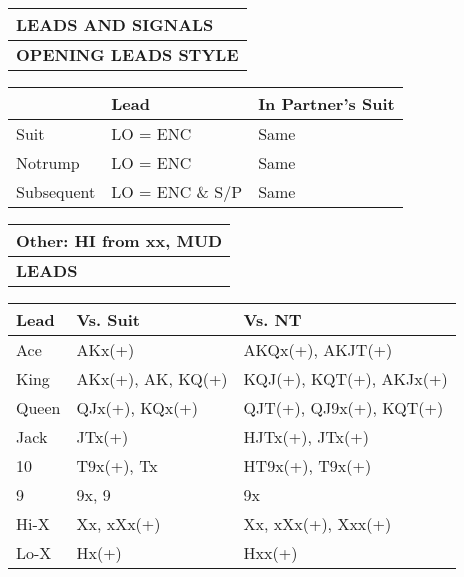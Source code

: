 \documentclass{article}
\begin{document}
\begin{minipage}{90mm}
	\begin{tabular}{| p{88mm} |}
		\hline
		\cellcolor{green!25} \textbf{LEADS AND SIGNALS} \\ \hline
		\cellcolor{orange!25}\textbf{OPENING LEADS STYLE} \\ \hline
	\end{tabular}
	\begin{tabular}{| p{15.25mm} | p{32mm} | p{32mm} |}
		& Lead & In Partner's Suit \\ \hline
		Suit & LO = ENC & Same \\ \hline
		Notrump & LO = ENC & Same \\ \hline
		Subsequent & LO = ENC \& S/P & Same \\ \hline
	\end{tabular}
	\begin{tabular}{| p{88mm} |}
		Other: HI from xx, MUD\\ \hline
		\cellcolor{orange!25}\textbf{LEADS} \\ \hline
	\end{tabular}
	\begin{tabular}{| p{15.25mm} | p{32mm} | p{32mm} |}
		Lead & Vs. Suit & Vs. NT \\ \hline
		Ace & AKx(+) & AKQx(+), AKJT(+)\\ \hline
		King & AKx(+), AK, KQ(+) & KQJ(+), KQT(+), AKJx(+)\\ \hline
		Queen & QJx(+), KQx(+) & QJT(+), QJ9x(+), KQT(+)\\ \hline
		Jack & JTx(+) & HJTx(+), JTx(+)\\ \hline
		10 & T9x(+), Tx & HT9x(+), T9x(+)\\ \hline
		9 & 9x, 9 & 9x \\ \hline
		Hi-X & Xx, xXx(+) & Xx, xXx(+), Xxx(+)\\ \hline
		Lo-X & Hx(+) & Hxx(+) \\ \hline
	\end{tabular}
	\begin{tabular}{| p{88mm} |}


\end{tabular}
\end{minipage}
\end{document}
